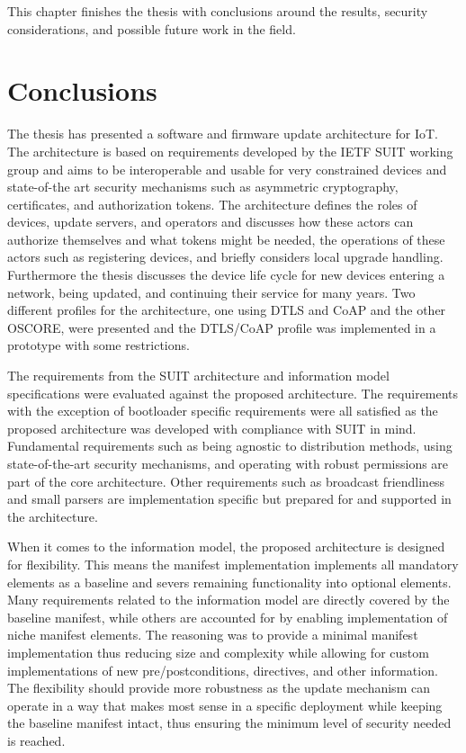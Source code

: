 \documentclass[0-thesis.tex]{subfiles}
\begin{document}
This chapter finishes the thesis with conclusions around the results, security
considerations, and possible future work in the field.

\section{Conclusions}
\label{sec:Conclusions}
The thesis has presented a software and firmware update architecture for IoT. The
architecture is based on requirements developed by the IETF SUIT working group and aims to
be interoperable and usable for very constrained devices and state-of-the art security
mechanisms such as asymmetric cryptography, certificates, and authorization tokens. The
architecture defines the roles of devices, update servers, and operators and discusses how
these actors can authorize themselves and what tokens might be needed, the operations of
these actors such as registering devices, and briefly considers local upgrade handling.
Furthermore the thesis discusses the device life cycle for new devices entering a network,
being updated, and continuing their service for many years. Two different profiles for the
architecture, one using DTLS and CoAP and the other OSCORE, were presented and the
DTLS/CoAP profile was implemented in a prototype with some restrictions.

The requirements from the SUIT architecture and information model specifications were
evaluated against the proposed architecture. The requirements with the exception of
bootloader specific requirements were all satisfied as the proposed architecture was
developed with compliance with SUIT in mind. Fundamental requirements such as being
agnostic to distribution methods, using state-of-the-art security mechanisms, and
operating with robust permissions are part of the core architecture. Other requirements
such as broadcast friendliness and small parsers are implementation specific but prepared
for and supported in the architecture.

When it comes to the information model, the proposed architecture is designed for
flexibility. This means the manifest implementation implements all mandatory elements as a
baseline and severs remaining functionality into optional elements. Many requirements
related to the information model are directly covered by the baseline manifest, while
others are accounted for by enabling implementation of niche manifest elements. The
reasoning was to provide a minimal manifest implementation thus reducing size and
complexity while allowing for custom implementations of new pre/postconditions,
directives, and other information. The flexibility should provide more robustness as the
update mechanism can operate in a way that makes most sense in a specific deployment while
keeping the baseline manifest intact, thus ensuring the minimum level of security needed
is reached. 
\end{document}

